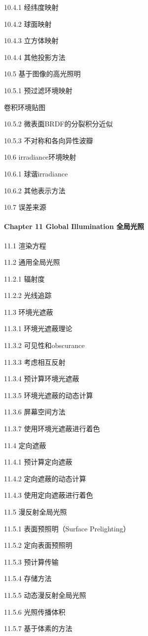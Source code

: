 \documentclass[
  paper=a4,
  ,captions=tableheading
]{scrartcl}
\begin{document}
10.4.1 经纬度映射

10.4.2 球面映射

10.4.3 立方体映射

10.4.4 其他投影方法

10.5 基于图像的高光照明

10.5.1 预过滤环境映射

卷积环境贴图

10.5.2 微表面BRDF的分裂积分近似

10.5.3 不对称和各向异性波瓣

10.6 irradiance环境映射

10.6.1 球谐irradiance

10.6.2 其他表示方法

10.7 误差来源

\paragraph{Chapter 11 Global Illumination
全局光照}\label{chapter-11-global-illumination-ux5168ux5c40ux5149ux7167}

11.1 渲染方程

11.2 通用全局光照

11.2.1 辐射度

11.2.2 光线追踪

11.3 环境光遮蔽

11.3.1 环境光遮蔽理论

11.3.2 可见性和obscurance

11.3.3 考虑相互反射

11.3.4 预计算环境光遮蔽

11.3.5 环境光遮蔽的动态计算

11.3.6 屏幕空间方法

11.3.7 使用环境光遮蔽进行着色

11.4 定向遮蔽

11.4.1 预计算定向遮蔽

11.4.2 定向遮蔽的动态计算

11.4.3 使用定向遮蔽进行着色

11.5 漫反射全局光照

11.5.1 表面预照明（Surface Prelighting）

11.5.2 定向表面预照明

11.5.3 预计算传输

11.5.4 存储方法

11.5.5 动态漫反射全局光照

11.5.6 光照传播体积

11.5.7 基于体素的方法
\end{document}
